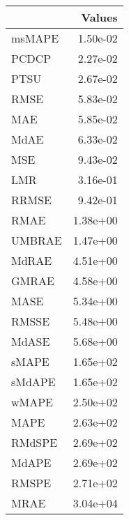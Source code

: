 \begin{tabular}{lr}
\toprule
 & Values \\
\midrule
msMAPE & 1.50e-02 \\
PCDCP & 2.27e-02 \\
PTSU & 2.67e-02 \\
RMSE & 5.83e-02 \\
MAE & 5.85e-02 \\
MdAE & 6.33e-02 \\
MSE & 9.43e-02 \\
LMR & 3.16e-01 \\
RRMSE & 9.42e-01 \\
RMAE & 1.38e+00 \\
UMBRAE & 1.47e+00 \\
MdRAE & 4.51e+00 \\
GMRAE & 4.58e+00 \\
MASE & 5.34e+00 \\
RMSSE & 5.48e+00 \\
MdASE & 5.68e+00 \\
sMAPE & 1.65e+02 \\
sMdAPE & 1.65e+02 \\
wMAPE & 2.50e+02 \\
MAPE & 2.63e+02 \\
RMdSPE & 2.69e+02 \\
MdAPE & 2.69e+02 \\
RMSPE & 2.71e+02 \\
MRAE & 3.04e+04 \\
\bottomrule
\end{tabular}
